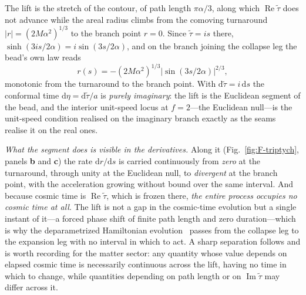 \documentclass[11pt,a4paper]{article}
\theoremstyle{plain}
\theoremstyle{definition}
\theoremstyle{remark}
\newcommand{\dd}{\mathrm{d}}
\begin{document}
The lift is the stretch of the contour, of path length $\pi\alpha/3$, along which $\operatorname{Re}\tilde\tau$
does not advance while the areal radius climbs from the comoving turnaround $|r|=(2M\alpha^{2})^{1/3}$ to the
branch point $r=0$. Since $\tilde\tau=is$ there, $\sinh(3is/2\alpha)=i\sin(3s/2\alpha)$, and on the branch
joining the collapse leg the bead's own law reads
\[
r(s)=-(2M\alpha^{2})^{1/3}\bigl\lvert\sin(3s/2\alpha)\bigr\rvert^{2/3},
\]
monotonic from the turnaround to the branch point. With $\dd\tilde\tau=i\,\dd s$ the conformal time
$\dd\eta=\dd\tilde\tau/a$ is \emph{purely imaginary}: the lift is the Euclidean segment of the bead, and the
interior unit-speed locus at $f=2$---the Euclidean null---is the unit-speed condition realised on the imaginary
branch exactly as the seams realise it on the real ones.

\emph{What the segment does is visible in the derivatives.} Along it (Fig.~\ref{fig:F-triptych}, panels
\textbf{b} and \textbf{c}) the rate $\dd r/\dd s$ is carried continuously from \emph{zero} at the turnaround,
through unity at the Euclidean null, to \emph{divergent} at the branch point, with the acceleration growing
without bound over the same interval. And because cosmic time is $\operatorname{Re}\tilde\tau$, which is frozen
there, \emph{the entire process occupies no cosmic time at all}. The lift is not a gap in the cosmic-time
evolution but a single instant of it---a forced phase shift of finite path length and zero duration---which is
why the deparametrized Hamiltonian evolution~\cite{JanzenCanonicalTime} passes from the collapse leg to the
expansion leg with no interval in which to act. A sharp separation follows and is worth recording for the matter
sector: any quantity whose value depends on elapsed cosmic time is necessarily continuous across the lift,
having no time in which to change, while quantities depending on path length or on $\operatorname{Im}\tilde\tau$
may differ across it.
\end{document}
